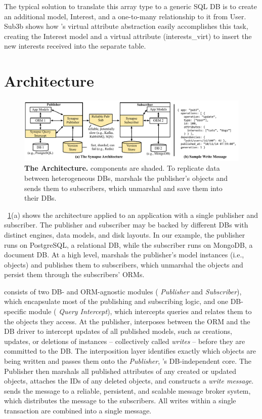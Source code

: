 The typical solution to translate this array type to a generic SQL DB is to create an additional model, Interest, and a one-to-many relationship to it from User.
Sub3b shows how \synapse's virtual attribute abstraction easily accomplishes
this task, creating the Interest model and a virtual
attribute (interests\_virt) to insert the new interests
received into the separate table.



\section{\synapse Architecture}
\label{sec:arch}

\begin{figure}[t]
 \centering
 \includegraphics[width=.9\linewidth,clip=true,trim=0 0.20in 2.2in 0]{figures/synapse/architecture-less-detail.pdf}
 \caption{{{\bf The \synapse Architecture.} \synapse components are shaded.  To
             replicate data between heterogeneous DBs, \synapse marshals the publisher's
             objects and sends them to subscribers, which unmarshal and save them into their DBs.}}
 \label{fig:architecture}
\end{figure}
\F~\ref{fig:architecture}(a) shows the \synapse architecture applied to an
application with a single publisher and subscriber. The publisher and subscriber
may be backed by different DBs with distinct engines, data models, and disk
layouts. In our example, the publisher runs on PostgreSQL, a relational DB,
while the subscriber runs on MongoDB, a document DB. At a high level, \synapse
marshals the publisher's model instances (i.e., objects) and publishes them to
subscribers, which unmarshal the objects and persist them through the
subscribers' ORMs.

\synapse consists of two DB- and ORM-agnostic modules ({\em \synapse
Publisher} and {\em \synapse Subscriber}), which encapsulate most of the
publishing and subscribing logic, and one DB-specific module ({\em \synapse
Query Intercept}), which intercepts queries and relates them to the objects they
access. At the publisher, \synapse interposes between the ORM and the DB
driver to intercept updates of all published models, such as creations, updates,
or deletions of instances -- collectively called {\em writes} -- before they are
committed to the DB. The interposition layer identifies exactly which objects
are being written and passes them onto the {\em \synapse Publisher},
\synapse's DB-independent core. The Publisher then marshals all published
attributes of any created or updated objects, attaches the IDs of any deleted
objects, and constructs a {\em write message}. \synapse sends the message to a
reliable, persistent, and scalable message broker system, which distributes the
message to the subscribers. All writes within a single transaction are combined
into a single message.

